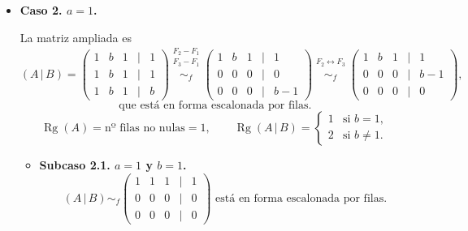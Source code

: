 \documentclass[a4paper,12pt]{article}
\begin{document}
\begin{ejercicio}[title=Ejercicio 31]
\begin{itemize}
\item \textbf{Caso 2. $a=1$.}

La matriz ampliada es
\[
(A\,|\,B)=
\begin{pmatrix}
1 & b & 1 &\Big|& 1\\
1 & b & 1 &\Big|& 1\\
1 & b & 1 &\Big|& b
\end{pmatrix}
\overset{\substack{F_2-F_1\\ F_3-F_1 \\{}}}{\sim_f}
\begin{pmatrix}
1 & b & 1 &\Big|& 1\\
0 & 0 & 0 &\Big|& 0\\
0 & 0 & 0 &\Big|& b-1
\end{pmatrix}
\overset{\substack{F_2 \leftrightarrow F_3 \\{}}}{\sim_f}
\begin{pmatrix}
1 & b & 1 &\Big|& 1\\
0 & 0 & 0 &\Big|& b-1\\
0 & 0 & 0 &\Big|& 0
\end{pmatrix},
\]
\[
\text{que está en forma escalonada por filas.}
\]
\[
\operatorname{Rg}(A)=\text{nº filas no nulas}=1,
\qquad
\operatorname{Rg}(A\,|\,B)=
\begin{cases}
1 & \text{si } b=1,\\[2mm]
2 & \text{si } b\neq 1.
\end{cases}
\]

\begin{itemize}
\item \textbf{Subcaso 2.1. $a=1$ y $b=1$.}
\[
(A\,|\,B)\sim_f
\begin{pmatrix}
1 & 1 & 1 &\Big|& 1\\
0 & 0 & 0 &\Big|& 0\\
0 & 0 & 0 &\Big|& 0
\end{pmatrix}
\text{ está en forma escalonada por filas.}
\]
\end{itemize}
\end{itemize}
\end{ejercicio}
\end{document}
